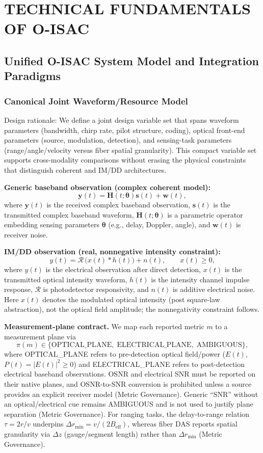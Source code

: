 \section{TECHNICAL FUNDAMENTALS OF O-ISAC}

\subsection{Unified O-ISAC System Model and Integration Paradigms}

\subsubsection{Canonical Joint Waveform/Resource Model}
Design rationale: We define a joint design variable set that spans waveform parameters (bandwidth, chirp rate, pilot structure, coding), optical front-end parameters (source, modulation, detection), and sensing-task parameters (range/angle/velocity versus fiber spatial granularity). This compact variable set supports cross-modality comparisons without erasing the physical constraints that distinguish coherent and IM/DD architectures.

\textbf{Generic baseband observation (complex coherent model):}
\[
\mathbf{y}(t)=\mathbf{H}(t;\boldsymbol{\theta})\mathbf{s}(t)+\mathbf{w}(t),
\]
where \(\mathbf{y}(t)\) is the received complex baseband observation, \(\mathbf{s}(t)\) is the transmitted complex baseband waveform, \(\mathbf{H}(t;\boldsymbol{\theta})\) is a parametric operator embedding sensing parameters \(\boldsymbol{\theta}\) (e.g., delay, Doppler, angle), and \(\mathbf{w}(t)\) is receiver noise.

\textbf{IM/DD observation (real, nonnegative intensity constraint):}
\[
y(t)=\mathcal{R}\,\big(x(t)\ast h(t)\big)+n(t),\qquad x(t)\ge 0,
\]
where \(y(t)\) is the electrical observation after direct detection, \(x(t)\) is the transmitted optical intensity waveform, \(h(t)\) is the intensity channel impulse response, \(\mathcal{R}\) is photodetector responsivity, and \(n(t)\) is additive electrical noise. Here \(x(t)\) denotes the modulated optical intensity (post square-law abstraction), not the optical field amplitude; the nonnegativity constraint follows.

\textbf{Measurement-plane contract.} We map each reported metric \(m\) to a measurement plane via
\[
\pi(m)\in\{\text{OPTICAL\_PLANE},\;\text{ELECTRICAL\_PLANE},\;\text{AMBIGUOUS}\},
\]
where OPTICAL\_PLANE refers to pre-detection optical field/power (\(E(t)\), \(P(t)=|E(t)|^2\ge 0\)) and ELECTRICAL\_PLANE refers to post-detection electrical baseband observations. OSNR and electrical SNR must be reported on their native planes, and OSNR-to-SNR conversion is prohibited unless a source provides an explicit receiver model (Metric Governance). Generic ``SNR'' without an optical/electrical cue remains AMBIGUOUS and is not used to justify plane separation (Metric Governance). For ranging tasks, the delay-to-range relation \(\tau=2r/v\) underpins \(\Delta r_{\min}=v/(2B_{\text{eff}})\), whereas fiber DAS reports spatial granularity via \(\Delta z\) (gauge/segment length) rather than \(\Delta r_{\min}\) (Metric Governance).

